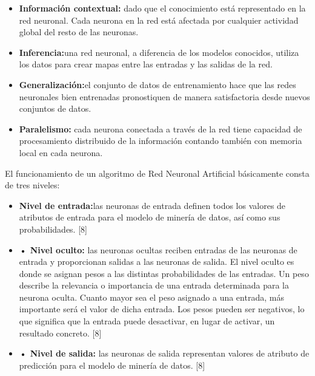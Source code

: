     \begin{itemize}
			\item \textbf{Información contextual:} dado que el conocimiento está representado en la red neuronal. Cada neurona en la red está afectada por cualquier actividad global del resto de las neuronas.  
\item \textbf{Inferencia:}una red neuronal, a diferencia  de los modelos conocidos,   utiliza los datos para crear mapas entre las entradas y las salidas de la red.
			\item \textbf{ Generalización:}el conjunto de datos de entrenamiento hace que las redes neuronales bien entrenadas pronostiquen de manera satisfactoria desde nuevos conjuntos de datos.
			\item \textbf{ Paralelismo:} cada neurona conectada a través de la red tiene capacidad de procesamiento distribuido de la información contando también con memoria local en cada neurona.			
    \end{itemize}
    
El funcionamiento de un algoritmo de Red Neuronal Artificial básicamente consta de tres niveles:    

\begin{itemize}
			\item \textbf{Nivel de entrada:}las neuronas de entrada definen todos los valores de atributos de entrada para el modelo de minería de datos, así como sus probabilidades. [8]  
			\item \textbf{•	Nivel oculto:} las neuronas ocultas reciben entradas de las neuronas de entrada y proporcionan salidas a las neuronas de salida. El nivel oculto es donde se asignan pesos a las distintas probabilidades de las entradas. Un peso describe la relevancia o importancia de una entrada determinada para la neurona oculta. Cuanto mayor sea el peso asignado a una entrada, más importante será el valor de dicha entrada. Los pesos pueden ser negativos, lo que significa que la entrada puede desactivar, en lugar de activar, un resultado concreto. [8]
			\item \textbf{•	Nivel de salida: } las neuronas de salida representan valores de atributo de predicción para el modelo de minería de datos. [8]
		 
		\end{itemize}
		
